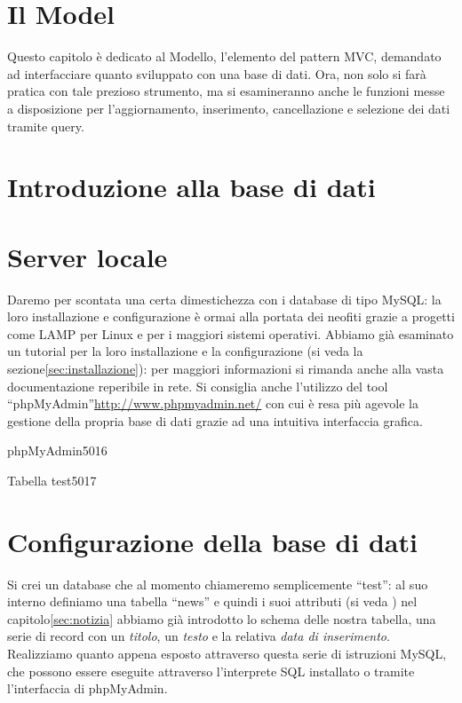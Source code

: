 \section{Il Model}
\label{cap:model}

Questo capitolo è dedicato al Modello, l'elemento del pattern \ac{MVC}, demandato ad interfacciare quanto sviluppato con una base di dati. Ora, non solo si farà pratica con tale prezioso strumento, ma si esamineranno anche le funzioni messe a disposizione per l'aggiornamento, inserimento, cancellazione e selezione dei dati tramite query.

\section*{Introduzione alla base di dati}
\omissis

\section*{Server locale}
Daremo per scontata una certa dimestichezza con i database di tipo MySQL: la loro installazione e configurazione è ormai alla portata dei neofiti grazie a progetti come LAMP per Linux e per i maggiori sistemi operativi. Abbiamo già esaminato un tutorial per la loro installazione e la configurazione (si veda la sezione\vref{sec:installazione}): per maggiori informazioni si rimanda anche alla vasta documentazione reperibile in rete. Si consiglia anche l'utilizzo del tool ``phpMyAdmin''\url{http://www.phpmyadmin.net/} con cui è resa più agevole la gestione della propria base di dati grazie ad una intuitiva interfaccia grafica.

\begin{img}{phpMyAdmin}{5}{016}
\end{img}

\begin{img}{Tabella test}{5}{017}
\end{img}

\section*{Configurazione della base di dati}
Si crei un database che al momento chiameremo semplicemente ``test'': al suo interno definiamo una tabella ``news'' e quindi i suoi attributi (si veda ) nel capitolo\vref{sec:notizia} abbiamo già introdotto lo schema delle nostra tabella, una serie di record con un \emph{titolo}, un \emph{testo} e la relativa \emph{data di inserimento}. Realizziamo quanto appena esposto attraverso questa serie di istruzioni MySQL, che possono essere eseguite attraverso l'interprete SQL installato o tramite l'interfaccia di phpMyAdmin.

